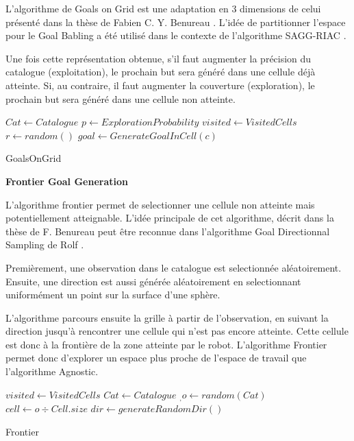 \documentclass[11pt,french]{report}
\begin{document}
\phantom{INVISIBLE LINE}

L'algorithme de Goals on Grid est une adaptation en 3 dimensions de celui présenté dans la thèse de Fabien C. Y. Benureau \cite{TheseBenureau}.
L'idée de partitionner l'espace pour le Goal Babling a été utilisé dans le contexte de l'algorithme SAGG-RIAC \cite{Intrinsic_motivation}.

\phantom{INVISIBLE LINE}

Une fois cette représentation obtenue, s'il faut augmenter la précision du catalogue (exploitation), le prochain but sera généré dans une cellule déjà atteinte.
Si, au contraire, il faut augmenter la couverture (exploration), le prochain but sera généré dans une cellule non atteinte.

\begin{algorithm}[h]
    \DontPrintSemicolon
    \LinesNumbered
    $Cat \leftarrow Catalogue$ \;
    $p \leftarrow ExplorationProbability$ \;
    $visited \leftarrow VisitedCells$ \;
    $r \leftarrow random()$ \;
    $goal \leftarrow GenerateGoalInCell(c)$ \;
    \caption{\label{alg:GoalsOnGrid} GoalsOnGrid}
\end{algorithm}

\textbf{Frontier Goal Generation}

\phantom{INVISIBLE LINE}

L'algorithme frontier permet de selectionner une cellule non atteinte mais potentiellement atteignable. L'idée principale de cet algorithme, décrit dans la thèse de F. Benureau \cite{TheseBenureau} peut être reconnue dans l'algorithme Goal Directionnal Sampling de Rolf \cite{Frontier}.

Premièrement, une observation dans le catalogue est selectionnée aléatoirement.
Ensuite, une direction est aussi générée aléatoirement en selectionnant uniformément un point sur la surface d'une sphère.

\phantom{INVISIBLE LINE}

L'algorithme parcours ensuite la grille à partir de l'observation, en suivant la direction jusqu'à rencontrer une cellule qui n'est pas encore atteinte.
Cette cellule est donc à la frontière de la zone atteinte par le robot.
L'algorithme Frontier permet donc d'explorer un espace plus proche de l'espace de travail que l'algorithme Agnostic.

\begin{algorithm}[h]
    \DontPrintSemicolon
    \LinesNumbered
    $visited \leftarrow VisitedCells$ \;
    $Cat \leftarrow Catalogue$ \;
    $_, o \leftarrow random(Cat)$ \;
    $cell \leftarrow o \div Cell.size$ \;
    $dir \leftarrow generateRandomDir()$ \;
    \caption{\label{alg:Frontier} Frontier}
\end{algorithm}
\end{document}
